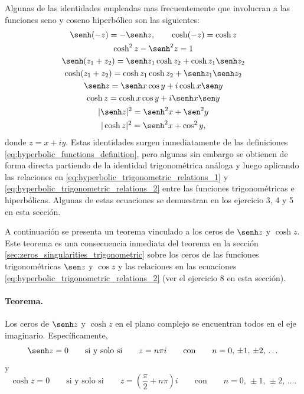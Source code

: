 \documentclass[a4paper]{report}
\begin{document}
Algunas de las identidades empleadas mas frecuentemente que involucran a las funciones seno y coseno hiperbólico son las siguientes:
\begin{gather}
 \senh(-z)=-\senh z,\qquad\cosh(-z)=\cosh z\label{eq:hyperbolic_relations_parity}\\
 \cosh^2z-\senh^2z=1\label{eq:hyperbolic_relations_square_substraction}\\
 \senh(z_1+z_2)=\senh z_1\cosh z_2+\cosh z_1\senh z_2\label{eq:hyperbolic_relations_senh_sum_arguments}\\ 
 \cosh(z_1+z_2)=\cosh z_1\cosh z_2+\senh z_1\senh z_2\label{eq:hyperbolic_relations_cosh_sum_arguments}\\
 \senh z=\senh x\cos y+i\cosh x\sen y\label{eq:hyperbolic_relations_senh_components}\\
 \cosh z=\cosh x\cos y+i\senh x\sen y\label{eq:hyperbolic_relations_cosh_components}\\
 |\senh z|^2=\senh^2x+\sen^2y\label{eq:hyperbolic_relations_senh_square_modulus}\\
 |\cosh z|^2=\senh^2x+\cos^2y,\label{eq:hyperbolic_relations_cosh_square_modulus}
\end{gather}
donde \(z=x+iy\). Estas identidades surgen inmediatamente de las definiciones \ref{eq:hyperbolic_functions_definition}, pero algunas sin embargo se obtienen de forma  directa partiendo de la identidad trigonométrica análoga y luego aplicando las relaciones en \ref{eq:hyperbolic_trigonometric_relations_1} y \ref{eq:hyperbolic_trigonometric_relations_2} entre las funciones trigonométricas e hiperbólicas. Algunas de estas ecuaciones se demuestran en los ejercicio 3, 4 y 5 en esta sección.

A continuación se presenta un teorema vinculado a los ceros de \(\senh z\) y \(\cosh z\). Este teorema es una consecuencia inmediata del teorema en la sección \ref{sec:zeros_singularities_trigonometric} sobre los ceros de las funciones trigonométricas \(\sen z\) y \(\cos z\) y las relaciones en las ecuaciones \ref{eq:hyperbolic_trigonometric_relations_2} (ver el ejercicio 8 en esta sección).

\paragraph{Teorema.} Los ceros de \(\senh z\) y \(\cosh z\) en el plano complejo se encuentran todos en el eje imaginario. Específicamente,
\[
 \senh z=0
 \qquad\textrm{si y solo si}\qquad
 z=n\pi i
 \qquad\textrm{con}\qquad 
 n=0,\,\pm1,\,\pm2,\,\dots
\]
y
\[
 \cosh z=0
 \qquad\textrm{si y solo si}\qquad
 z=\left(\frac{\pi}{2}+n\pi\right)i
 \qquad\textrm{con}\qquad 
 n=0,\,\pm1,\,\pm2,\,\dots.
\]
\end{document}

